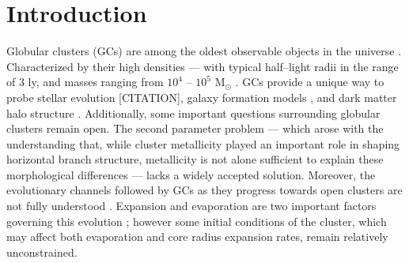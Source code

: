 \documentclass[twocolumn]{aastex62}
\newcommand{\colorred}[1]{\color{red}#1\color{black}\hspace{0.5mm}}
\begin{document}


\section{Introduction} \label{sec:intro}

Globular clusters (GCs) are among the oldest observable objects in the universe \citep{Pen11}. Characterized by their high densities --- with typical half--light radii in the range of 3 ly, and masses ranging from $10^{4}$ -- $ 10^{5} $ M$_{\odot}$ \citep{Bro06}. GCs provide a unique way to probe stellar evolution \colorred{[CITATION]}, galaxy formation models \citep{Boy18, Kra05}, and dark matter halo structure \citep{Hud18}. Additionally, some important questions surrounding globular clusters remain open. The second parameter problem \citep{Nor83} --- which arose with the understanding that, while cluster metallicity played an important role in shaping horizontal branch structure, metallicity is not alone sufficient to explain these morphological differences \citep{Dot13} --- lacks a widely accepted solution. Moreover, the evolutionary channels followed by GCs as they progress towards open clusters are not fully understood \citep{Mad17}. Expansion and evaporation are two important factors governing this evolution \citep{Fal01}; however some initial conditions of the cluster, which may affect both evaporation and core radius expansion rates, remain relatively unconstrained.
\end{document}
